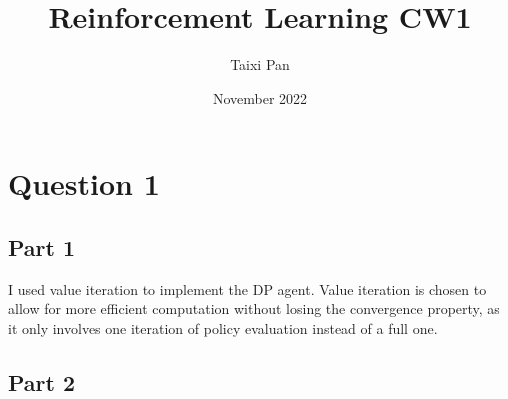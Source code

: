\documentclass{article}
\title{Reinforcement Learning CW1}
\author{Taixi Pan}
\date{November 2022}
\begin{document}
    \maketitle


    \section{Question 1}\label{sec:question-1}

    \subsection{Part 1}\label{subsec:question-1-1}
    I used value iteration to implement the DP agent.
    Value iteration is chosen to allow for more efficient computation without losing the convergence property, as it only involves one iteration of policy evaluation instead of a full one.

    \subsection{Part 2}\label{subsec:question-1-2}
\end{document}
